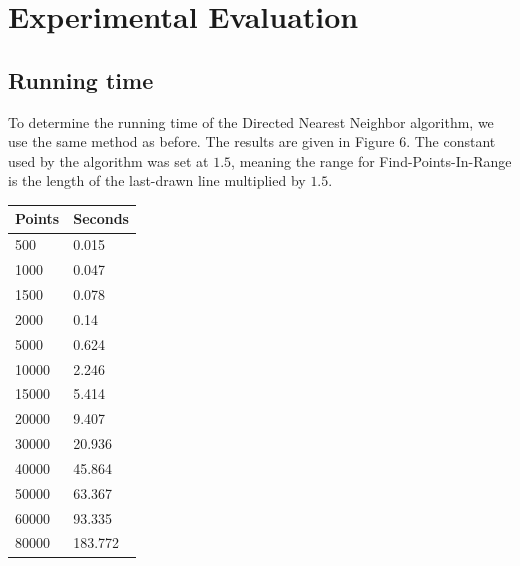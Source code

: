   \section{Experimental Evaluation}
  \label{sec:experimental_evaluation}
    \subsection{Running time}
        To determine the running time of the Directed Nearest Neighbor algorithm, we use the same method as before. The results are given in Figure 6. The constant used by the algorithm was set at $1.5$, meaning the range for Find-Points-In-Range is the length of the last-drawn line multiplied by $1.5$.\\
        \begin{tabular}{p{2.5cm}|p{2.5cm}}
            \hline
            Points & Seconds\\
            \hline
            \hline
            500 & 0.015\\
            \hline
            1000 & 0.047\\
            \hline
            1500 & 0.078\\
            \hline
            2000 & 0.14\\
            \hline
            5000 & 0.624\\
            \hline
            10000 & 2.246\\
            \hline
            15000 & 5.414\\
            \hline
            20000 & 9.407\\
            \hline
            30000 & 20.936\\
            \hline
            40000 & 45.864\\
            \hline
            50000 & 63.367\\
            \hline
            60000 & 93.335\\
            \hline
            80000 & 183.772\\
            \hline
        \end{tabular}
